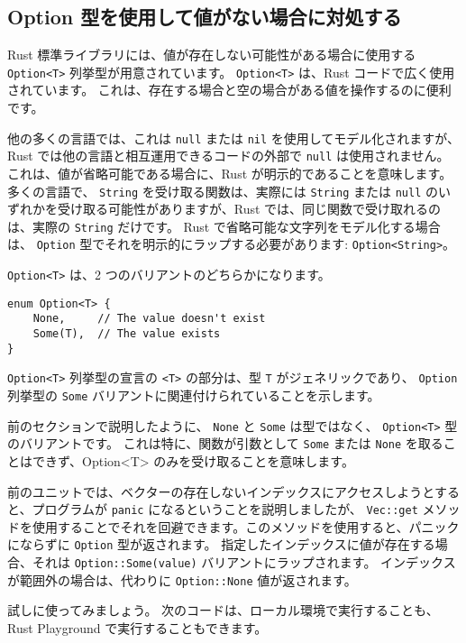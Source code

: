 \subsection{Option 型を使用して値がない場合に対処する}

Rust 標準ライブラリには、値が存在しない可能性がある場合に使用する \texttt{Option<T>} 列挙型が用意されています。 \texttt{Option<T>} は、Rust コードで広く使用されています。 これは、存在する場合と空の場合がある値を操作するのに便利です。

他の多くの言語では、これは \texttt{null} または \texttt{nil} を使用してモデル化されますが、Rust では他の言語と相互運用できるコードの外部で \texttt{null} は使用されません。 これは、値が省略可能である場合に、Rust が明示的であることを意味します。 多くの言語で、 \texttt{String} を受け取る関数は、実際には \texttt{String} または \texttt{null} のいずれかを受け取る可能性がありますが、Rust では、同じ関数で受け取れるのは、実際の \texttt{String} だけです。 Rust で省略可能な文字列をモデル化する場合は、 \texttt{Option} 型でそれを明示的にラップする必要があります: \texttt{Option<String>}。

\texttt{Option<T>} は、2 つのバリアントのどちらかになります。

\begin{lstlisting}[numbers=none]
enum Option<T> {
    None,     // The value doesn't exist
    Some(T),  // The value exists
}
\end{lstlisting}

\texttt{Option<T>} 列挙型の宣言の \texttt{<T>} の部分は、型 \texttt{T} がジェネリックであり、 \texttt{Option} 列挙型の \texttt{Some} バリアントに関連付けられていることを示します。

前のセクションで説明したように、 \texttt{None} と \texttt{Some} は型ではなく、 \texttt{Option<T>} 型のバリアントです。 これは特に、関数が引数として \texttt{Some} または \texttt{None} を取ることはできず、Option<T> のみを受け取ることを意味します。

前のユニットでは、ベクターの存在しないインデックスにアクセスしようとすると、プログラムが \texttt{panic} になるということを説明しましたが、 \texttt{Vec::get} メソッドを使用することでそれを回避できます。このメソッドを使用すると、パニックにならずに \texttt{Option} 型が返されます。 指定したインデックスに値が存在する場合、それは \texttt{Option::Some(value)} バリアントにラップされます。 インデックスが範囲外の場合は、代わりに \texttt{Option::None} 値が返されます。

試しに使ってみましょう。 次のコードは、ローカル環境で実行することも、Rust Playground で実行することもできます。


